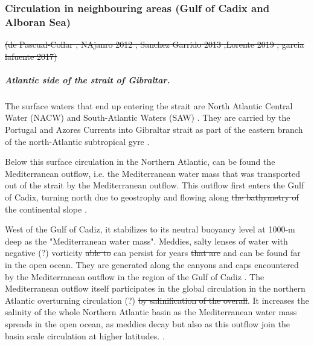 \subsubsection{Circulation in neighbouring areas (Gulf of Cadix and Alboran Sea)}
 \color{blue}\sout{(de Pascual-Collar ; NAjanro 2012 ; Sanchez Garrido 2013 ;Lorente 2019 ; garcia lafuente 2017)} 
 \color{black}

\subparagraph{Atlantic side \color{blue}of the strait of Gibraltar. \color{black}}
The surface waters that end up entering the strait are \color{blue} North Atlantic Central Water (NACW) \color{black} and South-Atlantic Waters (SAW) \color{black} \citep{millot_2014,naranjo_2015}. They are carried by the Portugal and Azores Currents into  \color{blue}Gibraltar strait \color{black} as part of the eastern branch of the north-Atlantic subtropical gyre \citep{barton_2001}.

Below this surface circulation \color{blue} in the Northern Atlantic\color{black}, can \color{blue}be found \color{black} the Mediterranean outflow, \color{blue} i.e. \color{black}the Mediterranean water mass that was transported out of the strait by the Mediterranean outflow. \color{blue}This outflow first enters \color{black} the Gulf of Cadix,  \color{blue}turning \color{black} north due to geostrophy and flowing along \sout{the bathymetry of} the continental slope \citep{price_1993,gasser_2017}. 

\color{blue} West of the Gulf of Cadiz, it \color{black} stabilizes to its neutral buoyancy level at \color{blue} 1000-m deep \color{black} as the "Mediterranean water mass"\citep{price_1993}. Meddies, salty lenses of water with negative  \color{blue}(?) \color{black} vorticity \sout{able to} \color{blue}can  \color{black} persist for years \sout{that are} \color{blue} and can be found \color{black} far in the open ocean. \color{blue}They \color{black} are generated along the canyons and caps encountered by the Mediterranean outflow in the region of the Gulf of Cadiz \citep{bashmachnikov_2015}. The Mediterranean outflow itself participates in the global circulation \color{blue}in the \color{blue}northern Atlantic \color{black} overturning circulation \color{blue}(?) \color{black} \sout{by salinification of the overall}. \color{blue} It increases the salinity of the whole Northern Atlantic basin as the Mediterranean water mass spreads in the open ocean, as meddies decay but also as this outflow join the basin scale circulation at higher latitudes. \color{black} \citep{price_1993,jia_2007}.

